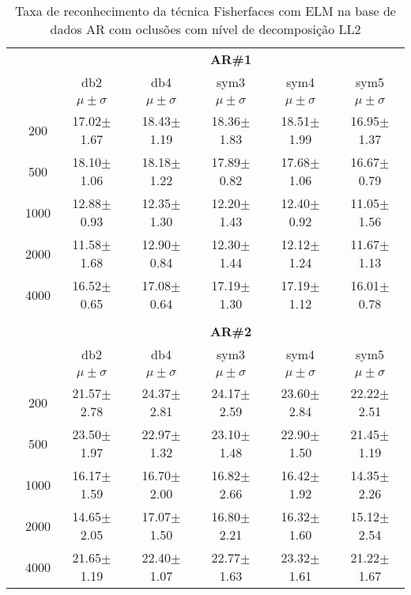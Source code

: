 \begin{table}[H]
	\centering
    \normalsize
	\caption{Taxa de reconhecimento da técnica Fisherfaces  com ELM na base de dados AR com oclusões com nível de decomposição LL2}
	\begin{tabular}{|c|c|c c c c c|}
\cline{3-7}
\multicolumn{2}{c|}{\multirow{3}{*}{}} & \multicolumn{5}{c|}{\textbf{AR\#1}}   \\\cline{3-7} 
\multicolumn{2}{c|}{}  & db2 & db4 & sym3 & sym4 & sym5 \\\cline{3-7}%
\multicolumn{2}{c|}{}& $\mu \pm \sigma$ & $\mu \pm \sigma$ & $\mu \pm \sigma$ & $\mu \pm \sigma$ & $\mu \pm \sigma$ \\\hline


\multicolumn{1}{|c|}{ \multirow{5}{*}{\rotatebox[origin=c]{90}{\textbf{Neurônios}}} }
&200	&17.02$\pm$1.67	&18.43$\pm$1.19	&18.36$\pm$1.83	&18.51$\pm$1.99	&16.95$\pm$1.37\\\cline{2-7}
&500	&18.10$\pm$1.06	&18.18$\pm$1.22	&17.89$\pm$0.82	&17.68$\pm$1.06	&16.67$\pm$0.79\\\cline{2-7}
&1000	&12.88$\pm$0.93	&12.35$\pm$1.30	&12.20$\pm$1.43	&12.40$\pm$0.92	&11.05$\pm$1.56\\\cline{2-7}
&2000	&11.58$\pm$1.68	&12.90$\pm$0.84	&12.30$\pm$1.44	&12.12$\pm$1.24	&11.67$\pm$1.13\\\cline{2-7}
&4000	&16.52$\pm$0.65	&17.08$\pm$0.64 &17.19$\pm$1.30	&17.19$\pm$1.12	&16.01$\pm$0.78




\\\midrule%

\multicolumn{7}{c}{}\\ 

\cline{3-7}
\multicolumn{2}{c|}{\multirow{3}{*}{}} & \multicolumn{5}{c|}{\textbf{AR\#2}}   \\\cline{3-7} 

\multicolumn{2}{c|}{}  & db2 & db4 & sym3 & sym4 & sym5 \\\cline{3-7}
\multicolumn{2}{c|}{}& $\mu \pm \sigma$ & $\mu \pm \sigma$ & $\mu \pm \sigma$ & $\mu \pm \sigma$ & $\mu \pm \sigma$ \\\hline


\multicolumn{1}{|c|}{ \multirow{5}{*}{\rotatebox[origin=c]{90}{\textbf{Neurônios}}} }
&200	&21.57$\pm$2.78	&24.37$\pm$2.81	&24.17$\pm$2.59	&23.60$\pm$2.84	&22.22$\pm$2.51\\\cline{2-7}
&500	&23.50$\pm$1.97	&22.97$\pm$1.32	&23.10$\pm$1.48	&22.90$\pm$1.50	&21.45$\pm$1.19\\\cline{2-7}
&1000	&16.17$\pm$1.59	&16.70$\pm$2.00	&16.82$\pm$2.66	&16.42$\pm$1.92	&14.35$\pm$2.26\\\cline{2-7}
&2000	&14.65$\pm$2.05	&17.07$\pm$1.50	&16.80$\pm$2.21	&16.32$\pm$1.60	&15.12$\pm$2.54\\\cline{2-7}
&4000	&21.65$\pm$1.19	&22.40$\pm$1.07	&22.77$\pm$1.63	&23.32$\pm$1.61	&21.22$\pm$1.67
	

\end{tabular}
\end{table}
